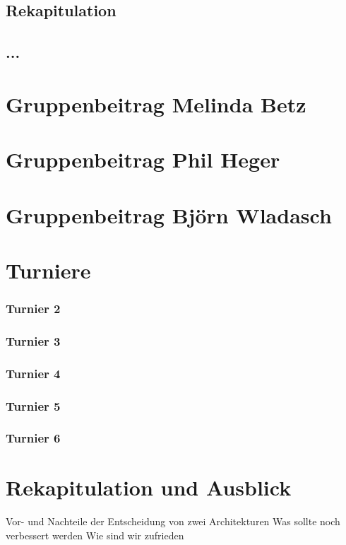 \documentclass[runningheads]{llncs}
\begin{document}
\subsection{Rekapitulation}

\subsection{...}

\section{Gruppenbeitrag Melinda Betz}

\section{Gruppenbeitrag Phil Heger}

\section{Gruppenbeitrag Björn Wladasch}

\section{Turniere}
\subsubsection{Turnier 2}
\subsubsection{Turnier 3}
\subsubsection{Turnier 4}
\subsubsection{Turnier 5}
\subsubsection{Turnier 6}

\section{Rekapitulation und Ausblick}
Vor- und Nachteile der Entscheidung von zwei Architekturen
Was sollte noch verbessert werden
Wie sind wir zufrieden
\end{document}

